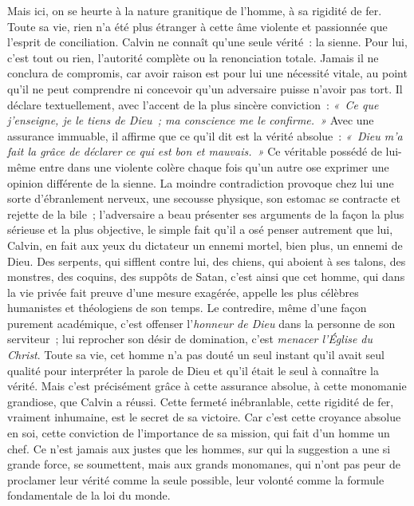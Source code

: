\documentclass[french,twoside]{book} %
\begin{document}
Mais ici, on se heurte à la nature granitique de l’homme, à sa rigidité de fer. Toute sa vie, rien n’a été plus étranger à cette âme violente et passionnée que l’esprit de conciliation. Calvin ne connaît qu’une seule vérité : la sienne. Pour lui, c’est tout ou rien, l’autorité complète ou la renonciation totale. Jamais il ne conclura de compromis, car avoir raison est pour lui une nécessité vitale, au point qu’il ne peut comprendre ni concevoir qu’un adversaire puisse n’avoir pas tort. Il déclare textuellement, avec l’accent de la plus sincère conviction : \emph{« Ce que j’enseigne, je le tiens de Dieu ; ma conscience me le confirme. »} Avec une assurance immuable, il affirme que ce qu’il dit est la vérité absolue : \emph{« Dieu m’a fait la grâce de déclarer ce qui est bon et mauvais. »} Ce véritable possédé de lui-même entre dans une violente colère chaque fois qu’un autre ose exprimer une opinion différente de la sienne. La moindre contradiction provoque chez lui une sorte d’ébranlement nerveux, une secousse physique, son estomac se contracte et rejette de la bile ; l’adversaire a beau présenter ses arguments de la façon la plus sérieuse et la plus objective, le simple fait qu’il a osé penser autrement que lui, Calvin, en fait aux yeux du dictateur un ennemi mortel, bien plus, un ennemi de Dieu. Des serpents, qui sifflent contre lui, des chiens, qui aboient à ses talons, des monstres, des coquins, des suppôts de Satan, c’est ainsi que cet homme, qui dans la vie privée fait preuve d’une mesure exagérée, appelle les plus célèbres humanistes et théologiens de son temps. Le contredire, même d’une façon purement académique, c’est offenser l’\emph{honneur de Dieu} dans la personne de son serviteur ; lui reprocher son désir de domination, c’est \emph{menacer l’Église du Christ}. Toute sa vie, cet homme n’a pas douté un seul instant qu’il avait seul qualité pour interpréter la parole de Dieu et qu’il était le seul à connaître la vérité. Mais c’est précisément grâce à cette assurance absolue, à cette monomanie grandiose, que Calvin a réussi. Cette fermeté inébranlable, cette rigidité de fer, vraiment inhumaine, est le secret de sa victoire. Car c’est cette croyance absolue en soi, cette conviction de l’importance de sa mission, qui fait d’un homme un chef. Ce n’est jamais aux justes que les hommes, sur qui la suggestion a une si grande force, se soumettent, mais aux grands monomanes, qui n’ont pas peur de proclamer leur vérité comme la seule possible, leur volonté comme la formule fondamentale de la loi du monde.\par
\end{document}
